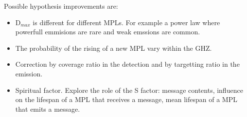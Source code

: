 \documentclass[crop]{CSLB}
\begin{document}
Possible hypothesis improvements are:

\begin{itemize}
   \item D$_{max}$ is different for different MPLs.  For example a power
      law where powerfull emmisions are rare and weak emssions are
      common.
   \item The probability of the rising of a new MPL vary within the GHZ.
   \item Correction by coverage ratio in the detection and by
      targetting ratio in the emission.
   \item Spiritual factor.  Explore the role of the S factor: message
      contents, influence on the lifespan of a MPL that receives a
      message, mean lifespan of a MPL that emits a message.
\end{itemize} 

 






\end{document}

